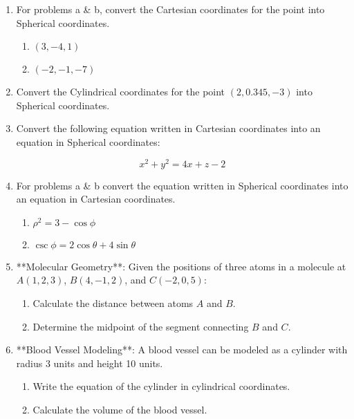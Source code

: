 \documentclass[11pt]{article}
\begin{document}
\begin{enumerate}
    \item For problems a \& b, convert the Cartesian coordinates for the point into Spherical coordinates.

    \begin{enumerate}
        \item \( (3, -4, 1) \)
    
        \item \( (-2, -1, -7) \)
    \end{enumerate}

    \item Convert the Cylindrical coordinates for the point \( (2, 0.345, -3) \) into Spherical coordinates.

    \item Convert the following equation written in Cartesian coordinates into an equation in Spherical coordinates:

\[
x^2 + y^2 = 4x + z - 2
\]

    \item For problems a \& b convert the equation written in Spherical coordinates into an equation in Cartesian coordinates.

    \begin{enumerate}
        \item \( \rho^2 = 3 - \cos \phi \)
    
        \item \( \csc \phi = 2 \cos \theta + 4 \sin \theta \)
    \end{enumerate}






    \item **Molecular Geometry**: Given the positions of three atoms in a molecule at \( A(1, 2, 3) \), \( B(4, -1, 2) \), and \( C(-2, 0, 5) \):
    \begin{enumerate}
        \item Calculate the distance between atoms \( A \) and \( B \).
        \item Determine the midpoint of the segment connecting \( B \) and \( C \).
    \end{enumerate}

    \item **Blood Vessel Modeling**: A blood vessel can be modeled as a cylinder with radius 3 units and height 10 units. 
    \begin{enumerate}
        \item Write the equation of the cylinder in cylindrical coordinates.
        \item Calculate the volume of the blood vessel.
    \end{enumerate}


\end{enumerate}
\end{document}
